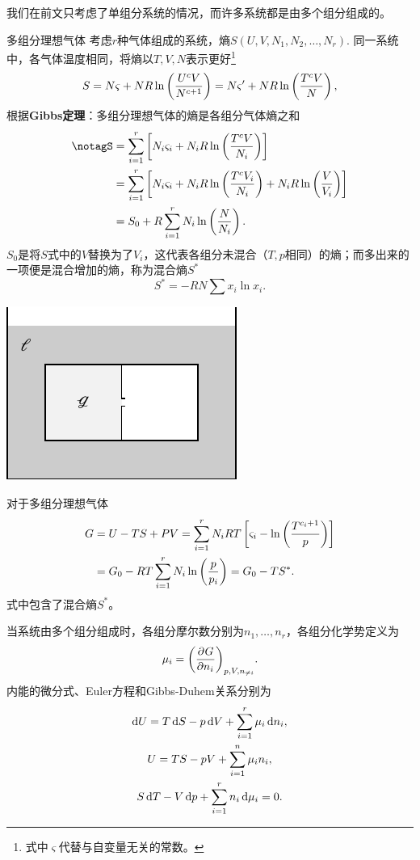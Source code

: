 我们在前文只考虑了单组分系统的情况，而许多系统都是由多个组分组成的。

\begin{example}
	{多组分理想气体}{}
	考虑$r$种气体组成的系统，熵$S(U,V,N_1,N_2,\ldots,N_r).$%
	同一系统中，各气体温度相同，将熵以$T,V,N$表示更好\footnote{式中$\varsigma$代替与自变量无关的常数。}
	$$S=N\varsigma+NR\ln\kh{\frac{U^cV}{N^{c+1}}}=N\varsigma'+NR\ln\kh{\frac{T^cV}N},$$
	根据\textbf{Gibbs定理}：多组分理想气体的熵是各组分气体熵之和%
	\begin{align}\notag%
	S & =\sum_{i=1}^r\fkh{N_i\varsigma_i+N_iR\ln\kh{\frac{T^cV}{N_i}}}                            \\\notag
		& =\sum_{i=1}^r\fkh{N_i\varsigma_i+N_iR\ln\kh{\frac{T^cV_i}{N_i}}+N_iR\ln\kh{\frac V{V_i}}} \\
		& =S_0+R\sum_{i=1}^rN_i\ln\kh{\frac N{N_i}}.
	\end{align}
	$S_0$是将$S$式中的$V$替换为了$V_i$，这代表各组分未混合（$T,p$相同）的熵；而多出来的一项便是混合增加的熵，称为混合熵$S^\ast$
	\[S^*=-RN\sum x_i\ln x_i.\]
	\begin{center}
	\includegraphics[page=4]{figures/tikz/layouts.pdf}
	\end{center}
	对于多组分理想气体
	\begin{align*}
		G & =U-TS+PV
		=\sum_{i=1}^rN_iRT\fkh{\varsigma_i-\ln\kh{\frac{T^{c_i+1}}p}} \\
		& =G_0-RT\sum_{i=1}^rN_i\ln\kh{\frac p{p_i}}=G_0-TS^*.
	\end{align*}
	式中包含了混合熵$S^*$。
\end{example}

当系统由多个组分组成时，各组分摩尔数分别为$n_1,\ldots,n_r$，各组分化学势定义为
\begin{equation}
	\mu_i=\pu[p,V,n_{\neq i}]G{n_i}.
\end{equation}
内能的微分式、Euler方程和Gibbs-Duhem关系分别为
\begin{subequations}
	\begin{gather}
		\d U=T\d S-p\d V+\sum_{i=1}^r\mu_i\d n_i,\\
		U=TS-pV+\sum_{i=1}^n\mu_in_i,\\
		S\d T-V\d p+\sum_{i=1}^rn_i\d\mu_i=0.
	\end{gather}
\end{subequations}

